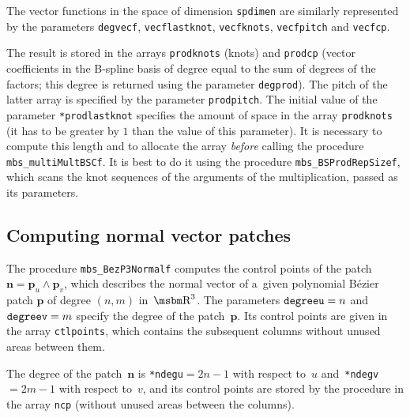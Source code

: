 The vector functions in the space of dimension \texttt{spdimen} are similarly
represented by the parameters \texttt{degvecf}, \texttt{vecflastknot},
\texttt{vecfknots}, \texttt{vecfpitch} and \texttt{vecfcp}.

The result is stored in the arrays \texttt{prodknots} (knots) and \texttt{prodcp}
(vector coefficients in the B-spline basis of degree equal to the sum of
degrees of the factors; this degree is returned using the parameter
\texttt{degprod}). The pitch of the latter array is specified by the
parameter  \texttt{prodpitch}. The initial value of the parameter 
\texttt{*prodlastknot} specifies the amount of space in the array
\texttt{prodknots}
(it has to be greater by $1$ than the value of this parameter).
It is necessary to compute this length and to allocate the array
\emph{before} calling the procedure
\texttt{mbs\_multiMultBSCf}. It is best to do it using the procedure
\texttt{mbs\_BSProdRepSizef}, which scans the knot sequences of the
arguments of the multiplication, passed as its parameters.


\subsection{Computing normal vector patches}

\hspace*{\parindent}The procedure \texttt{mbs\_BezP3Normalf} computes the
control points of the patch $\bm{n}=\bm{p}_u\wedge\bm{p}_v$,
which describes the normal vector of a~given polynomial B\'{e}zier patch
$\bm{p}$ of degree $(n,m)$ in~$\R^3$.
The parameters $\mathord{\mbox{\texttt{degreeu}}}=n$
and~$\mathord{\mbox{\texttt{degreev}}}=m$ specify the degree
of the patch~$\bm{p}$. Its control points are given
in the array \texttt{ctlpoints}, which contains the subsequent
columns without unused areas between them.

The degree of the patch~$\bm{n}$ is \texttt{*ndegu}$=2n-1$ with respect to~$u$
and~\texttt{*ndegv}$=2m-1$ with respect to~$v$, and its control points
are stored by the procedure in the array \texttt{ncp} (without unused areas
between the columns).

